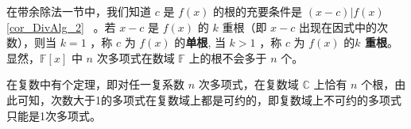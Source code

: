 在带余除法一节中，我们知道 $c$ 是 $f(x)$ 的根的充要条件是 $(x-c)|f(x)$ \autoref{cor_DivAlg_2}~ 。若 $x-c$ 是 $f(x)$ 的 $k$ 重根（即 $x-c$ 出现在因式中的次数），则当 $k=1$ ，称 $c$ 为 $f(x)$ 的\textbf{单根}, 当 $k>1$ ，称 $c$ 为 $f(x)$ 的\textbf{$k$ 重根}。显然，$\mathbb{F}[x]$ 中 $n$ 次多项式在数域 $\mathbb{F}$ 上的根不会多于 $n$ 个。

在复数中有个定理，即对任一复系数 $n$ 次多项式，在复数域 $\mathbb{C}$ 上恰有 $n$ 个根，由此可知，次数大于1的多项式在复数域上都是可约的，即复数域上不可约的多项式只能是1次多项式。
